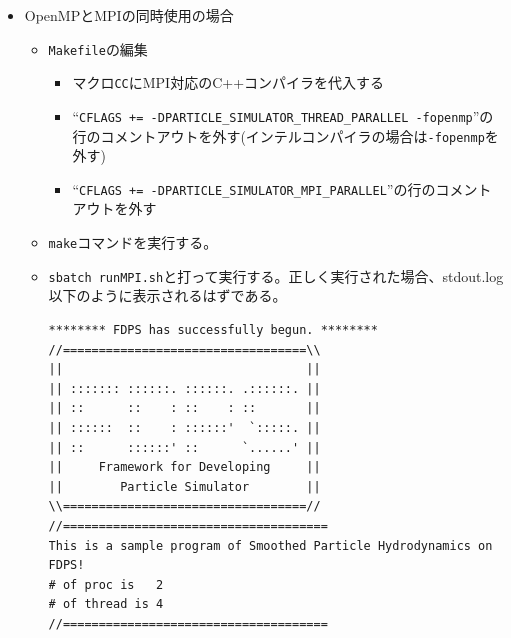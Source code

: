 \documentclass[12pt,a4paper,dvipdfmx]{jarticle}
\begin{document}
\begin{itemize}
\item OpenMPとMPIの同時使用の場合
  \begin{itemize}
  \item \texttt{Makefile}の編集
    \begin{itemize}
    \item マクロ\texttt{CC}にMPI対応のC++コンパイラを代入する
    \item ``\texttt{CFLAGS += -DPARTICLE\_SIMULATOR\_THREAD\_PARALLEL -fopenmp}''の
      行のコメントアウトを外す(インテルコンパイラの場合は\texttt{-fopenmp}を外す)
    \item ``\texttt{CFLAGS += -DPARTICLE\_SIMULATOR\_MPI\_PARALLEL}''の行のコメント
      アウトを外す
    \end{itemize}
  \item \texttt{make}コマンドを実行する。
  \item \texttt{sbatch runMPI.sh}と打って実行する。正しく実行された場合、stdout.log以下のように表示されるはずである。
\begin{screen}
\begin{verbatim}
******** FDPS has successfully begun. ********
//==================================\\
||                                  ||
|| ::::::: ::::::. ::::::. .::::::. ||
|| ::      ::    : ::    : ::       ||
|| ::::::  ::    : ::::::'  `:::::. ||
|| ::      ::::::' ::      `......' ||
||     Framework for Developing     ||
||        Particle Simulator        ||
\\==================================//
//=====================================
This is a sample program of Smoothed Particle Hydrodynamics on FDPS!
# of proc is   2
# of thread is 4
//=====================================
\end{verbatim}
\end{screen}
  \end{itemize}
\end{itemize}
\end{document}
